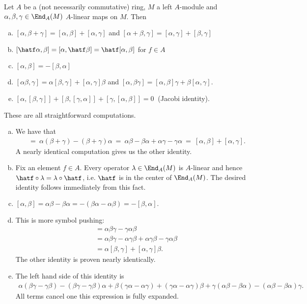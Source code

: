 \begin{prop}\label{prop:commutator-relations}
	Let $A$ be a (not necessarily commutative) ring, $M$ a left $A$-module and $\alpha,\beta,\gamma \in \End_A(M)$ $A$-linear maps on $M$. Then
	\begin{enumerate}[(a)]
		\item $[\alpha,\beta + \gamma] = [\alpha,\beta] + [\alpha, \gamma]$ and $[\alpha + \beta, \gamma] = [\alpha, \gamma] + [\beta,\gamma]$
		\item $[\hatf\alpha,\beta] = [\alpha,\hatf\beta] = \hatf[\alpha,\beta]$ for $f \in A$
		\item $[\alpha,\beta] = -[\beta,\alpha]$
		\item $[\alpha\beta,\gamma] = \alpha[\beta,\gamma] + [\alpha,\gamma]\beta$ and $[\alpha,\beta\gamma] = [\alpha,\beta]\gamma + \beta[\alpha,\gamma]$.
		\item $[\alpha,[\beta,\gamma]] + [\beta,[\gamma,\alpha]] + [\gamma,[\alpha,\beta]] = 0~$ \hspace{0.5em}(Jacobi identity).
	\end{enumerate}
\end{prop}
\begin{prf}
	These are all straightforward computations.
	\begin{enumerate}[(a)]
		\item We have that
			\begin{align*}
				[\alpha,\beta+\gamma] 
				  &~=~ \alpha(\beta+\gamma) - (\beta+\gamma)\alpha
				  ~=~ \alpha\beta - \beta\alpha + \alpha\gamma - \gamma\alpha
				  ~=~ [\alpha,\beta] + [\alpha,\gamma].
			\end{align*}
			A nearly identical computation gives us the other identity.
		\item Fix an element $f \in A$. Every operator $\lambda \in \End_A(M)$ is $A$-linear and hence $\hatf\circ\lambda = \lambda\circ \hatf$, i.e. $\hatf$ is in the center of $\End_A(M)$. The desired identity follows immediately from this fact.
		\item $[\alpha,\beta] = \alpha\beta - \beta\alpha = -(\beta\alpha - \alpha\beta) = -[\beta,\alpha]$. 
		\item This is more symbol pushing:
			\begin{align*}
				[\alpha\beta,\gamma] 
				  &= \alpha\beta\gamma - \gamma\alpha\beta \\
				  &= \alpha \beta\gamma - \alpha\gamma\beta + \alpha\gamma\beta - \gamma\alpha\beta \\
				  &= \alpha[\beta,\gamma] + [\alpha,\gamma]\beta.
			\end{align*}
			The other identity is proven nearly identically.
		\item The left hand side of this identity is
			\begin{align*}
				\alpha(\beta\gamma - \gamma\beta) - (\beta\gamma - \gamma\beta)\alpha + \beta(\gamma\alpha - \alpha\gamma) + (\gamma\alpha - \alpha\gamma)\beta + \gamma(\alpha\beta - \beta\alpha) - (\alpha\beta-\beta\alpha)\gamma.
			\end{align*}
			All terms cancel one this expression is fully expanded.
	\end{enumerate}
\end{prf}

